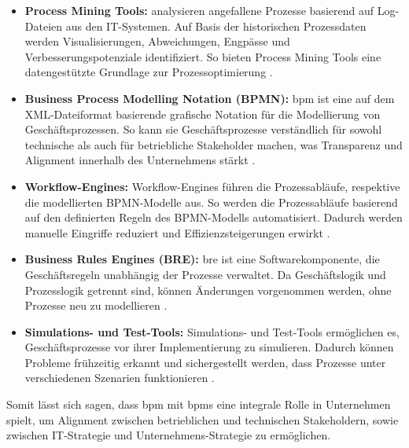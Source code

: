         \begin{itemize} 
            
            \item \textbf{Process Mining Tools: } analysieren angefallene Prozesse basierend auf Log-Dateien aus den IT-Systemen. Auf Basis der historischen Prozessdaten werden Visualisierungen, Abweichungen, Engpässe und Verbesserungspotenziale identifiziert. So bieten Process Mining Tools eine datengestützte Grundlage zur Prozessoptimierung \citep{vanderAalst2016}.

            \item \textbf{Business Process Modelling Notation (BPMN): } \gls{bpm} ist eine auf dem XML-Dateiformat basierende grafische Notation für die Modellierung von Geschäftsprozessen. So kann sie Geschäftsprozesse verständlich für sowohl technische als auch für betriebliche Stakeholder machen, was Transparenz und Alignment innerhalb des Unternehmens stärkt \citep{bpmn2024}.
            
            \item \textbf{Workflow-Engines: } Workflow-Engines führen die Prozessabläufe, respektive die modellierten BPMN-Modelle aus. So werden die Prozessabläufe basierend auf den definierten Regeln des BPMN-Modells automatisiert. Dadurch werden manuelle Eingriffe reduziert und Effizienzsteigerungen erwirkt \citep{camunda2024}.
            
            \item \textbf{Business Rules Engines (BRE): } \gls{bre} ist eine Softwarekomponente, die Geschäftsregeln unabhängig der Prozesse verwaltet. Da Geschäftslogik und Prozesslogik getrennt sind, können Änderungen vorgenommen werden, ohne Prozesse neu zu modellieren \citep{swoox2024}.
            
            \item \textbf{Simulations- und Test-Tools: } Simulations- und Test-Tools ermöglichen es, Geschäftsprozesse vor ihrer Implementierung zu simulieren. Dadurch können Probleme frühzeitig erkannt und sichergestellt werden, dass Prozesse unter verschiedenen Szenarien funktionieren \citep{visualparadigm2024}.
            
            \end{itemize}
        Somit lässt sich sagen, dass \gls{bpm} mit \gls{bpms} eine integrale Rolle in Unternehmen spielt, um Alignment zwischen betrieblichen und technischen Stakeholdern, sowie zwischen  IT-Strategie und Unternehmens-Strategie zu ermöglichen.

